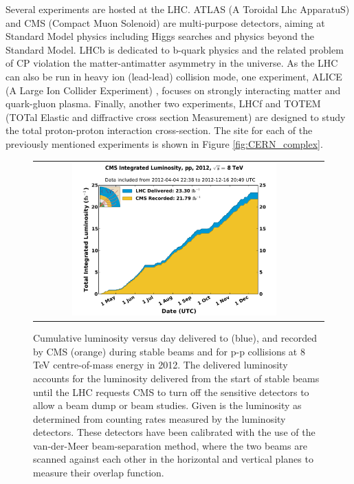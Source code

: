 Several experiments are hosted at the LHC. ATLAS (A Toroidal Lhc ApparatuS) \cite{det::ATLAS} and CMS (Compact Muon Solenoid) \cite{Chatrchyan:2008zzk} are multi-purpose detectors, aiming at Standard Model physics including Higgs searches and physics beyond the Standard Model. LHCb \cite{det::LHCb} is dedicated to b-quark physics and the related problem of CP violation the matter-antimatter asymmetry in the universe. As the LHC can also be run in heavy ion (lead-lead) collision mode, one experiment, ALICE (A Large Ion Collider Experiment) \cite{det::ALICE}, focuses on strongly interacting matter and quark-gluon plasma. Finally, another two experiments, LHCf \cite{Adriani:2008zz} and TOTEM (TOTal Elastic and diffractive cross section Measurement) \cite{Anelli:2008zza} are designed to study the total proton-proton interaction cross-section. The site for each of the previously mentioned experiments is shown in Figure \ref{fig:CERN_complex}. 

\begin{figure}[tbh!]
	\centering
	\begin{tabular}{cc}
		\includegraphics[width=0.75\textwidth]{detector/pics/int_lumi_per_day_cumulative_pp_2012.pdf}
	\end{tabular}
	\caption{Cumulative luminosity versus day delivered to (blue), and recorded by CMS (orange) during stable beams and for p-p collisions at 8 TeV centre-of-mass energy in 2012. The delivered luminosity accounts for the luminosity delivered from the start of stable beams until the LHC requests CMS to turn off the sensitive detectors to allow a beam dump or beam studies. Given is the luminosity as determined from counting rates measured by the luminosity detectors. These detectors have been calibrated with the use of the van-der-Meer beam-separation method, where the two beams are scanned against each other in the horizontal and vertical planes to measure their overlap function.}
	\label{fig:lumi_2012}
\end{figure}

